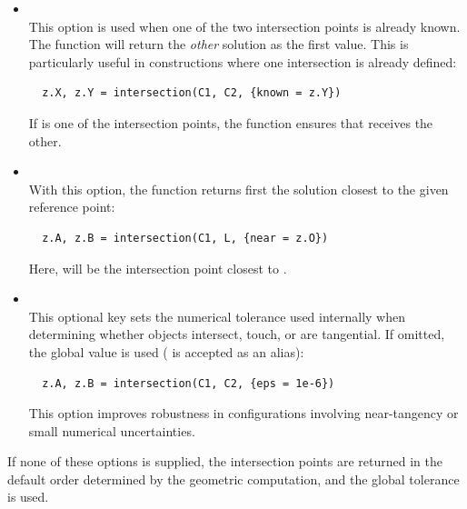 \begin{itemize}
  \item {}  \\
  This option is used when one of the two intersection points is already known.
  The function will return the \emph{other} solution as the first value.
  This is particularly useful in constructions where one intersection is already defined:

  \begin{mybox}
  \begin{verbatim}
  z.X, z.Y = intersection(C1, C2, {known = z.Y})
  \end{verbatim}
  \end{mybox}

  If  is one of the intersection points, the function ensures that  receives the other.

  \item {}  \\
  With this option, the function returns first the solution closest to the given reference point:

  \begin{mybox}
  \begin{verbatim}
  z.A, z.B = intersection(C1, L, {near = z.O})
  \end{verbatim}
  \end{mybox}

  Here,  will be the intersection point closest to .

  \item {}  \\
  This optional key sets the numerical tolerance used internally when determining
  whether objects intersect, touch, or are tangential.
  If omitted, the global value  is used
  ( is accepted as an alias):

  \begin{mybox}
  \begin{verbatim}
  z.A, z.B = intersection(C1, C2, {eps = 1e-6})
  \end{verbatim}
  \end{mybox}

  This option improves robustness in configurations involving near-tangency or
  small numerical uncertainties.

\end{itemize}

If none of these options is supplied, the intersection points are returned in the default order determined by the geometric computation, and the global tolerance  is used.

